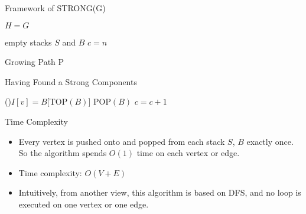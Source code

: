 \documentclass{beamer}
\begin{document}
\begin{frame}{Framework of STRONG(G)}
	\SetAlFnt{\small}
	\begin{algorithm}[H]
		\caption{Strong components: Main-DFS(G) (DFS caller)}
		$H=G$\;
	\end{algorithm}
	\begin{procedure}[H]
		\caption{STRONG(G)}
		empty stacks $S$ and $B$\;
		$c=n$\;
	\end{procedure}
\end{frame}

\begin{frame}{Growing Path P}
	\SetAlFnt{\small}
	\begin{algorithm}[H]
		\caption{A Part of High-Level Algorithm}
	\end{algorithm}
	\begin{procedure}[H]
		\caption{A Part of DFS(v)}
	\end{procedure}
\end{frame}

\begin{frame}{Having Found a Strong Components}
	\SetAlFnt{\small}
	\begin{algorithm}[H]
		\caption{A Part of High-Level Algorithm}
	\end{algorithm}
	\begin{procedure}[H]
		\caption{A Part of DFS(v)}
		\If(){$I[v]=B[$TOP$(B)]$} {
			POP$(B)$\;
			$c = c + 1$\;
		}
	\end{procedure}
\end{frame}

\begin{frame}{Time Complexity}
	\begin{itemize}
		\item
		Every vertex is pushed onto and popped from each stack $S$, $B$ exactly once.
		So the algorithm spends $O(1)$ time on each vertex or edge.
		\item
		Time complexity: $O(V+E)$
		\item
		Intuitively, from another view, this algorithm is based on DFS, and no loop
		is executed on one vertex or one edge.
	\end{itemize}
\end{frame}
\end{document}
